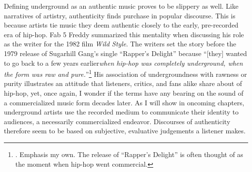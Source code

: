 Defining underground as an authentic music proves to be slippery as well. Like narratives of artistry, authenticity
finds purchase in popular discourse. This is  because artists tie music they deem authentic closely to the early,
pre-recorded era of hip-hop. Fab 5 Freddy summarized this mentality when discussing  his role as the writer for 
the 1982 film \textit{Wild Style}. The writers set the story before the 1979 release of Sugarhill Gang's single
``Rapper's Delight'' because ``[they] wanted to go back to a few years earlier\textellipsis \emph{when hip-hop was 
completely underground, when the form was raw and pure.}''\footnote{
    \autocite[23]{justinawilliamsRhyminStealinMusical2013}. Emphasis my own. The release
    of ``Rapper's Delight'' is often thought of as the moment when hip-hop went commercial.}
His association of undergroundness with rawness or purity illustrates an attitude that listeners, critics, and fans
alike share about of hip-hop, yet, once again, I wonder if the terms have any bearing on the sound of a commercialized
music form decades later. As I will show in oncoming chapters, underground artists use the recorded medium to communicate
their identity to audiences, a necessarily commercialized endeavor. Discourses of authenticity therefore seem to be based
on subjective, evaluative judgements a listener makes.

